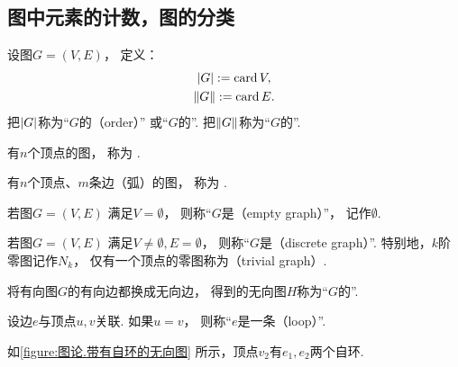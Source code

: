 \subsection{图中元素的计数，图的分类}
\begin{definition}
设图\(G = (V,E)\)，
定义：\begin{gather*}
	\abs{G} := \operatorname{card} V, \\
	\norm{G} := \operatorname{card} E.
\end{gather*}
把\(\abs{G}\)称为“\(G\)的（order）”
或“\(G\)的”.
把\(\norm{G}\)称为“\(G\)的”.
\end{definition}

\begin{definition}
有\(n\)个顶点的图，
称为 .
\end{definition}

\begin{definition}
有\(n\)个顶点、\(m\)条边（弧）的图，
称为 .
\end{definition}

\begin{definition}
若图\(G = (V,E)\)
满足\(V = \emptyset\)，
则称“\(G\)是（empty graph）”，
记作\(\emptyset\).
\end{definition}

\begin{definition}
若图\(G = (V,E)\)
满足\(V \neq \emptyset,E = \emptyset\)，
则称“\(G\)是（discrete graph）”.
特别地，\(k\)阶零图记作\(N_k\)，
仅有一个顶点的零图称为（trivial graph）.
\end{definition}

\begin{definition}
将有向图\(G\)的有向边都换成无向边，
得到的无向图\(H\)称为“\(G\)的”.
\end{definition}

\begin{definition}
设边\(e\)与顶点\(u,v\)关联.
如果\(u = v\)，
则称“\(e\)是一条（loop）”.
\end{definition}

如\cref{figure:图论.带有自环的无向图} 所示，顶点\(v_2\)有\(e_1,e_2\)两个自环.

